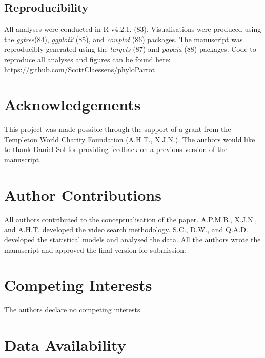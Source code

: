 \documentclass[
  man, donotrepeattitle,floatsintext]{apa6}
\begin{document}
\hypertarget{reproducibility}{%
\subsection{Reproducibility}\label{reproducibility}}

All analyses were conducted in R v4.2.1. (83). Visualisations were
produced using the \emph{ggtree}(84), \emph{ggplot2} (85), and \emph{cowplot}
(86) packages. The manuscript was reproducibly generated using the
\emph{targets} (87) and \emph{papaja} (88) packages. Code to reproduce all
analyses and figures can be found here:
\url{https://github.com/ScottClaessens/phyloParrot}

\newpage
\nolinenumbers

\hypertarget{acknowledgements}{%
\section{Acknowledgements}\label{acknowledgements}}

This project was made possible through the support of a grant from the Templeton
World Charity Foundation (A.H.T., X.J.N.). The authors would like to thank
Daniel Sol for providing feedback on a previous version of the manuscript.

\hypertarget{author-contributions}{%
\section{Author Contributions}\label{author-contributions}}

All authors contributed to the conceptualisation of the paper. A.P.M.B., X.J.N.,
and A.H.T. developed the video search methodology. S.C., D.W., and Q.A.D.
developed the statistical models and analysed the data. All the authors wrote
the manuscript and approved the final version for submission.

\hypertarget{competing-interests}{%
\section{Competing Interests}\label{competing-interests}}

The authors declare no competing interests.

\hypertarget{data-availability}{%
\section{Data Availability}\label{data-availability}}
\end{document}

